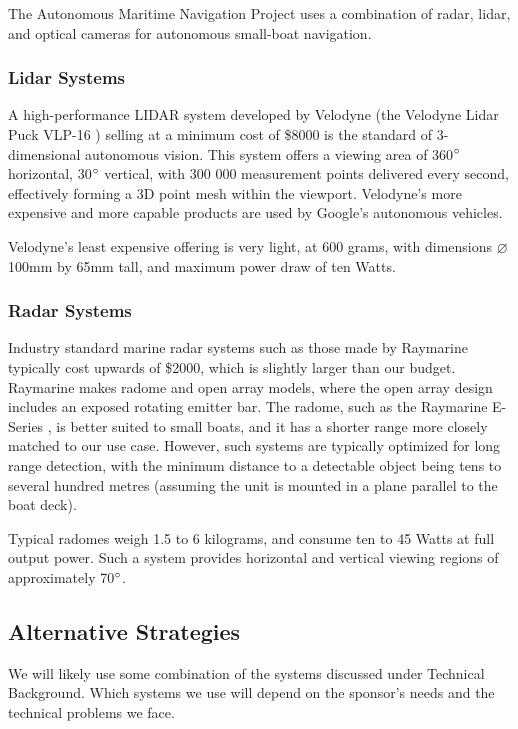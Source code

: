 The Autonomous Maritime Navigation Project uses a combination of radar, lidar, and optical cameras for autonomous small-boat navigation.

\subsubsection{\label{sec:intro:commercial:lidar}Lidar Systems}
A high-performance LIDAR system developed by Velodyne (the Velodyne Lidar Puck VLP-16 \cite{velodyne-vlp16}) selling at a minimum cost of \$8000 is the standard of 3-dimensional autonomous vision. This system offers a viewing area of 360$\degree$ horizontal, 30$\degree$ vertical, with 300 000 measurement points delivered every second, effectively forming a 3D point mesh within the viewport. Velodyne's more expensive and more capable products are used by Google's autonomous vehicles.

Velodyne's least expensive offering is very light, at 600 grams, with dimensions $\varnothing$100mm by 65mm tall, and maximum power draw of ten Watts.


\subsubsection{\label{sec:intro:commercial:radar}Radar Systems}
Industry standard marine radar systems such as those made by Raymarine typically cost upwards of \$2000, which is slightly larger than our budget. Raymarine makes radome and open array models, where the open array design includes an exposed rotating emitter bar. The radome, such as the Raymarine E-Series \cite{raymarine-eseries}, is better suited to small boats, and it has a shorter range more closely matched to our use case. However, such systems are typically optimized for long range detection, with the minimum distance to a detectable object being tens to several hundred metres (assuming the unit is mounted in a plane parallel to the boat deck).

Typical radomes weigh 1.5 to 6 kilograms, and consume ten to 45 Watts at full output power. Such a system provides horizontal and vertical viewing regions of approximately 70$\degree$.

\subsection{\label{sec:intro:alternatives}Alternative Strategies}
We will likely use some combination of the systems discussed under Technical Background.  Which systems we use will depend on the sponsor's needs and the technical problems we face.
